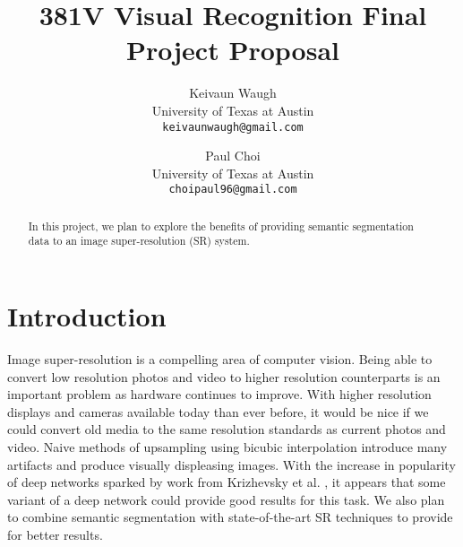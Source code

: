 \documentclass[10pt,twocolumn,letterpaper]{article}
\begin{document}
\title{381V Visual Recognition Final Project Proposal}

\author{Keivaun Waugh\\
University of Texas at Austin\\
{\tt\small keivaunwaugh@gmail.com}
\and
Paul Choi\\
University of Texas at Austin\\
{\tt\small choipaul96@gmail.com}
}

\maketitle

\begin{abstract}
    In this project, we plan to explore the benefits of providing semantic segmentation data to an image super-resolution (SR) system. 
\end{abstract}

\section{Introduction}
Image super-resolution is a compelling area of computer vision. Being able to
convert low resolution photos and video to higher resolution counterparts is an
important problem as hardware continues to improve. With higher resolution
displays and cameras available today than ever before, it would be nice if we
could convert old media to the same resolution standards as current photos and
video. Naive methods of upsampling using bicubic interpolation introduce many
artifacts and produce visually displeasing images. With the increase in
popularity of deep networks sparked by work from Krizhevsky et al.
\cite{AlexNet}, it appears that some variant of a deep network could provide
good results for this task. We also plan to combine semantic segmentation with
state-of-the-art SR techniques to provide for better results.

\end{document}
